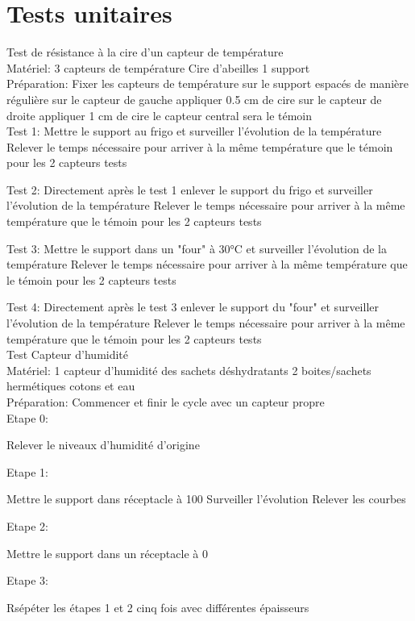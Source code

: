 \chapter{Tests unitaires}

Test de résistance à la cire d'un capteur de température  
\\
Matériel:  
3 capteurs de température  
Cire d'abeilles  
1 support  
\\
Préparation:  
Fixer les capteurs de température sur le support espacés de manière régulière sur le capteur de gauche appliquer 0.5 cm de cire sur le capteur de droite appliquer 1 cm de cire le capteur central sera le témoin  
\\
Test 1:  
Mettre le support au frigo et surveiller l'évolution de la température  
Relever le temps nécessaire pour arriver à la même température que le témoin pour les 2 capteurs tests  

Test 2:  
Directement après le test 1 enlever le support du frigo et surveiller l'évolution de la température  
Relever le temps nécessaire pour arriver à la même température que le témoin pour les 2 capteurs tests

Test 3:  
Mettre le support dans un "four" à 30°C et surveiller l'évolution de la température  
Relever le temps nécessaire pour arriver à la même température que le témoin pour les 2 capteurs tests  

Test 4:  
Directement après le test 3 enlever le support du "four" et surveiller l'évolution de la température  
Relever le temps nécessaire pour arriver à la même température que le témoin pour les 2 capteurs tests  
\\
Test Capteur d'humidité 
\\
Matériel: 
1 capteur d'humidité des sachets déshydratants 
2 boites/sachets hermétiques cotons et eau 
\\
Préparation: 
Commencer et finir le cycle avec un capteur propre 
\\
Etape 0:  

Relever le niveaux d'humidité d'origine 

Etape 1: 

Mettre le support dans réceptacle à 100%
Surveiller l'évolution 
Relever les courbes 

Etape 2: 

Mettre le support dans un réceptacle à 0%

Etape 3:  

Rsépéter les  étapes 1 et 2 cinq fois avec différentes épaisseurs